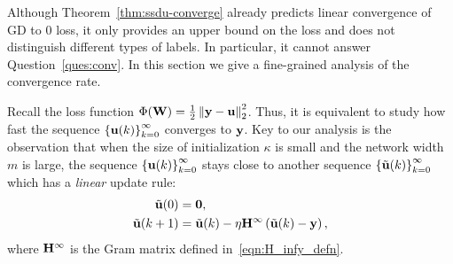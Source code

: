 Although Theorem~\ref{thm:ssdu-converge} already predicts linear convergence of GD to $0$ loss, it only provides an upper bound on the loss and does not distinguish different types of labels. In particular, it cannot answer Question~\ref{ques:conv}.
In this section we give a fine-grained analysis of the convergence rate.

Recall the loss function $\Phi(\mathbf{W}) = \frac12 \left\|\mathbf{y} - \mathbf{u}\right\|_2^2$.
Thus, %
it is equivalent to study how fast the sequence $\left\{\mathbf{u}(k) \right\}_{k=0}^\infty$ converges to $\mathbf{y}$.
Key to our analysis is the observation that when the size of initialization $\kappa$ is small and the network width $m$ is large, the sequence $\left\{\mathbf{u}(k) \right\}_{k=0}^\infty$ stays close to another sequence $\left\{\tilde{\mathbf{u}}(k)\right\}_{k=0}^\infty$ which has a \emph{linear} update rule:
\begin{equation}
\begin{aligned}
\tilde{\mathbf{u}}(0) &= \mathbf{0}, \\
\tilde{\mathbf{u}}(k+1) &= \tilde{\mathbf{u}}(k) - \eta \mathbf{H}^\infty\left(\tilde{\mathbf{u}}(k)-\mathbf{y}\right), \label{eqn:u_hat_dynamics}
\end{aligned}
\end{equation}
where $\mathbf{H}^\infty$ is the Gram matrix defined in~\eqref{eqn:H_infy_defn}.

